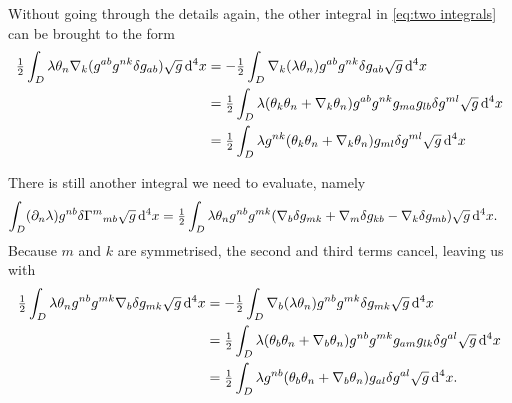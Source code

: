 \documentclass[../main.tex]{subfiles}
\begin{document}
Without going through the details again, the other integral in \cref{eq:two integrals} can
be brought to the form
\begin{align*} \label{eq:}
	\tfrac{1}{2} \int_D \lambda \theta_n \nabla_k (g^{ab}g^{nk}\delta g_{ab}) \sqrt{g} \,\mathrm{d}^4
	x 
	& = - \tfrac{1}{2} \int_D \nabla_k(\lambda \theta_n) g^{ab}g^{nk}\delta g_{ab} \sqrt{g}
	\,\mathrm{d}^4 x \\
	& = \tfrac{1}{2} \int_D \lambda(\theta_k\theta_n + \nabla_k\theta_n) g^{ab}g^{nk}
	g_{ma}g_{lb}\delta g^{ml} \sqrt{g}\,\mathrm{d}^4 x \\
	& = \tfrac{1}{2}\int_D \lambda g^{nk}(\theta_k\theta_n + \nabla_k \theta_n)g_{ml} \delta
	g^{ml} \sqrt{g} \,\mathrm{d}^4 x
\end{align*}

There is still another integral we need to evaluate, namely
\begin{align}
	\int_D (\partial_n \lambda) g^{nb}\delta{\Gamma^m}_{mb} \sqrt{g} \,\mathrm{d}^4 x 
	& = \tfrac{1}{2} \int_D \lambda \theta_n g^{nb} g^{mk}(\nabla_b \delta g_{mk} + \nabla_m
	\delta g_{kb} - \nabla_k \delta g_{mb}) \sqrt{g} \,\mathrm{d}^4 x. 
\end{align}
Because \( m \) and \( k \) are symmetrised, the second and third terms cancel, leaving
us with
\begin{align}
	\tfrac{1}{2}\int_D \lambda \theta_n g^{nb}g^{mk}\nabla_b \delta g_{mk} \sqrt{g} \,\mathrm{d}^4 x
	& = - \tfrac{1}{2} \int_D \nabla_b(\lambda \theta_n) g^{nb}g^{mk} \delta g_{mk} \sqrt{g}
	\,\mathrm{d}^4 x \\
	& = \tfrac{1}{2} \int_D \lambda(\theta_b\theta_n + \nabla_b
	\theta_n)g^{nb}g^{mk}g_{am}g_{lk}\delta g^{al} \sqrt{g} \,\mathrm{d}^4 x \\
	& = \tfrac{1}{2} \int_D \lambda g^{nb}(\theta_b \theta_n + \nabla_b \theta_n)
	g_{al} \delta g^{al} \sqrt{g} \,\mathrm{d}^4 x. 
\end{align}
\end{document}

